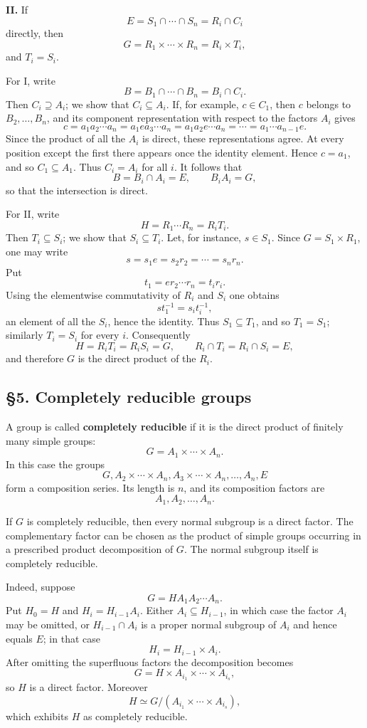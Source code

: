 \documentclass[
  11pt,
]{article}
\begin{document}
\textbf{II.} If \[
  E=S_1\cap\cdots\cap S_n=R_i\cap C_i
\] directly, then \[
  G=R_1\times\cdots\times R_n=R_i\times T_i,
\] and \(T_i=S_i\).

For I, write \[
  B=B_1\cap\cdots\cap B_n=B_i\cap C_i.
\] Then \(C_i\supseteq A_i\); we show that \(C_i\subseteq A_i\). If, for
example, \(c\in C_1\), then \(c\) belongs to \(B_2,\ldots,B_n\), and its
component representation with respect to the factors \(A_i\) gives \[
  c=a_1a_2\cdots a_n
   =a_1ea_3\cdots a_n
   =a_1a_2e\cdots a_n
   =\cdots=a_1\cdots a_{n-1}e.
\] Since the product of all the \(A_i\) is direct, these representations
agree. At every position except the first there appears once the
identity element. Hence \(c=a_1\), and so \(C_1\subseteq A_1\). Thus
\(C_i=A_i\) for all \(i\). It follows that \[
  B=B_i\cap A_i=E,
  \qquad B_iA_i=G,
\] so that the intersection is direct.

For II, write \[
  H=R_1\cdots R_n=R_iT_i.
\] Then \(T_i\subseteq S_i\); we show that \(S_i\subseteq T_i\). Let,
for instance, \(s\in S_1\). Since \(G=S_1\times R_1\), one may write \[
  s=s_1e=s_2r_2=\cdots=s_nr_n.
\] Put \[
  t_1=er_2\cdots r_n=t_ir_i.
\] Using the elementwise commutativity of \(R_i\) and \(S_i\) one
obtains \[
  s t_1^{-1}=s_it_i^{-1},
\] an element of all the \(S_i\), hence the identity. Thus
\(S_1\subseteq T_1\), and so \(T_1=S_1\); similarly \(T_i=S_i\) for
every \(i\). Consequently \[
  H=R_iT_i=R_iS_i=G,
  \qquad R_i\cap T_i=R_i\cap S_i=E,
\] and therefore \(G\) is the direct product of the \(R_i\).

\subsection{§5. Completely reducible
groups}\label{completely-reducible-groups}

A group is called \textbf{completely reducible} if it is the direct
product of finitely many simple groups: \[
  G=A_1\times\cdots\times A_n.
\] In this case the groups \[
  G,
  A_2\times\cdots\times A_n,
  A_3\times\cdots\times A_n,
  \ldots,
  A_n,
  E
\] form a composition series. Its length is \(n\), and its composition
factors are \[
  A_1,A_2,\ldots,A_n.
\]

If \(G\) is completely reducible, then every normal subgroup is a direct
factor. The complementary factor can be chosen as the product of simple
groups occurring in a prescribed product decomposition of \(G\). The
normal subgroup itself is completely reducible.

Indeed, suppose \[
  G=H A_1A_2\cdots A_n.
\] Put \(H_0=H\) and \(H_i=H_{i-1}A_i\). Either
\(A_i\subseteq H_{i-1}\), in which case the factor \(A_i\) may be
omitted, or \(H_{i-1}\cap A_i\) is a proper normal subgroup of \(A_i\)
and hence equals \(E\); in that case \[
  H_i=H_{i-1}\times A_i.
\] After omitting the superfluous factors the decomposition becomes \[
  G=H\times A_{i_1}\times\cdots\times A_{i_s},
\] so \(H\) is a direct factor. Moreover \[
  H\simeq G/(A_{i_1}\times\cdots\times A_{i_s}),
\] which exhibits \(H\) as completely reducible.
\end{document}
